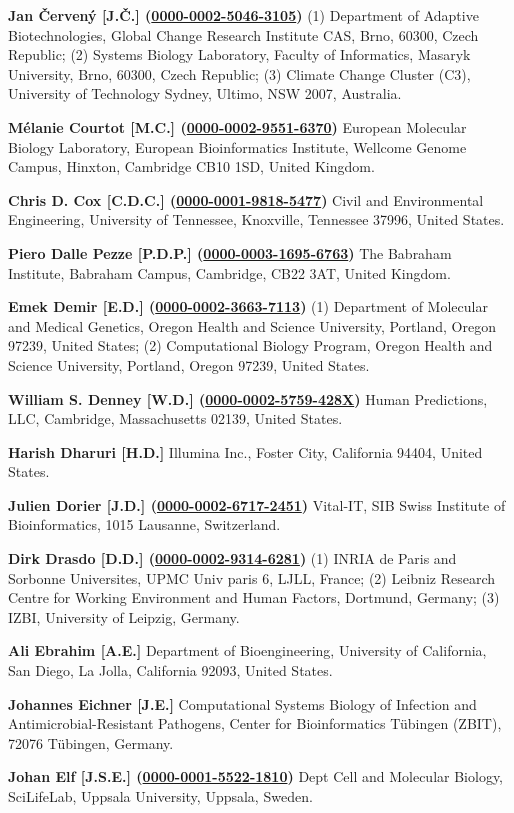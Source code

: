 \documentclass{sbml-paper}
\newcommand{\orcid}[1]{\href{https://orcid.org/#1}{#1}}
\begin{document}
\textbf{Jan Červený [J.Č.] (\orcid{0000-0002-5046-3105})} (1) Department of Adaptive Biotechnologies, Global Change Research Institute CAS, Brno, 60300, Czech Republic; (2) Systems Biology Laboratory, Faculty of Informatics, Masaryk University, Brno, 60300, Czech Republic; (3) Climate Change Cluster (C3), University of Technology Sydney, Ultimo, NSW 2007, Australia.

\textbf{Mélanie Courtot [M.C.] (\orcid{0000-0002-9551-6370})} European Molecular Biology Laboratory, European Bioinformatics Institute, Wellcome Genome Campus, Hinxton, Cambridge CB10 1SD, United Kingdom.

\textbf{Chris D. Cox [C.D.C.] (\orcid{0000-0001-9818-5477})} Civil and Environmental Engineering, University of Tennessee, Knoxville, Tennessee 37996, United States.

\textbf{Piero Dalle Pezze [P.D.P.] (\orcid{0000-0003-1695-6763})} The Babraham Institute, Babraham Campus, Cambridge, CB22 3AT, United Kingdom.

\textbf{Emek Demir [E.D.] (\orcid{0000-0002-3663-7113})} (1) Department of Molecular and Medical Genetics, Oregon Health and Science University, Portland, Oregon 97239, United States; (2) Computational Biology Program, Oregon Health and Science University, Portland, Oregon 97239, United States.

\textbf{William S. Denney [W.D.] (\orcid{0000-0002-5759-428X})} Human Predictions, LLC, Cambridge, Massachusetts 02139, United States.

\textbf{Harish Dharuri [H.D.]} Illumina Inc., Foster City, California 94404, United States.

\textbf{Julien Dorier [J.D.] (\orcid{0000-0002-6717-2451})} Vital-IT, SIB Swiss Institute of Bioinformatics, 1015 Lausanne, Switzerland.

\textbf{Dirk Drasdo [D.D.] (\orcid{0000-0002-9314-6281})} (1) INRIA de Paris and Sorbonne Universites, UPMC Univ paris 6, LJLL, France; (2) Leibniz Research Centre for Working Environment and Human Factors, Dortmund, Germany; (3) IZBI, University of Leipzig, Germany.

\textbf{Ali Ebrahim [A.E.]} Department of Bioengineering, University of California, San Diego, La Jolla, California 92093, United States.

\textbf{Johannes Eichner [J.E.]} Computational Systems Biology of Infection and Antimicrobial-Resistant Pathogens, Center for Bioinformatics Tübingen (ZBIT), 72076 Tübingen, Germany.

\textbf{Johan Elf [J.S.E.] (\orcid{0000-0001-5522-1810})} Dept Cell and Molecular Biology, SciLifeLab, Uppsala University, Uppsala, Sweden.
\end{document}
